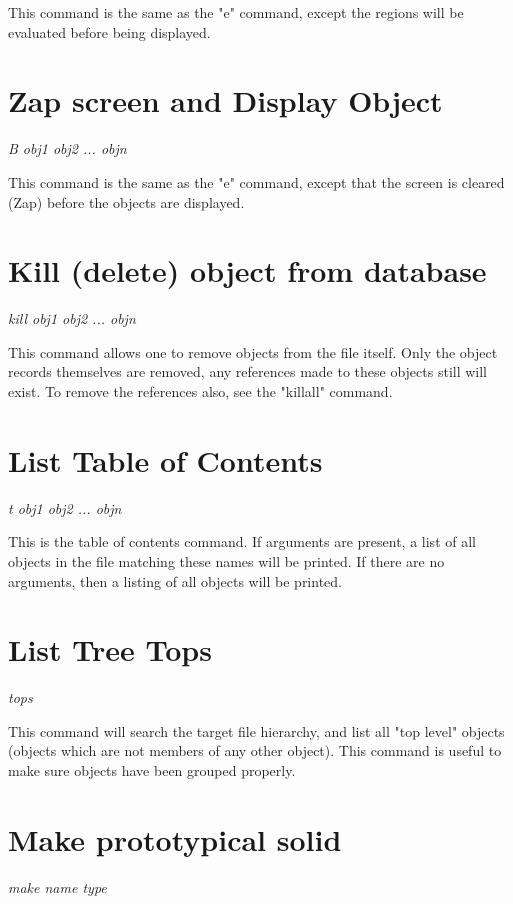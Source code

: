 This command is the same as the "e" command, except the regions will
be evaluated before being displayed.

\section{Zap screen and Display Object}

{\em \center
B obj1 obj2 ... objn
}

This command is the same as the "e" command, except that the screen
is cleared (Zap) before the objects are displayed.

\section{Kill (delete) object from database}

{\em \center
kill obj1 obj2 ... objn
}

This command allows one to remove objects from the file itself.
Only the object records themselves are removed, any references made
to these objects still will exist.
To remove the references also, see the "killall" command.

\section{List Table of Contents}

{\em \center
t obj1 obj2 ... objn
}

This is the table of contents command.  If arguments are present, a list
of all objects in the file matching these names will be printed.
If there are no arguments, then a listing of all objects will be printed.

\section{List Tree Tops}

{\em \center
tops
}

This command will search the target file hierarchy, and list all "top level"
objects (objects which are not members of any other object).
This command is useful to make sure objects have been grouped properly.

\section{Make prototypical solid}

{\em \center
make name type
}

